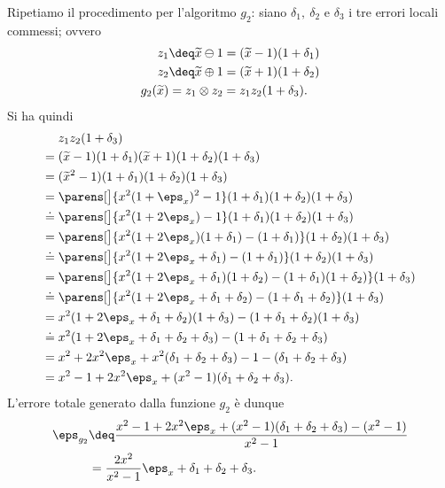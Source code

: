 \begin{example}
Ripetiamo il procedimento per l'algoritmo $g_2$: siano $\delta_1,\ \delta_2$ e $\delta_3$ i tre errori locali commessi; ovvero \begin{align*}
    z_1 &\deq \tilde{x} \ominus 1 = (\tilde x - 1)(1 + \delta_1)\\
    z_2 &\deq \tilde{x} \oplus 1 = (\tilde x + 1)(1 + \delta_2)\\
    g_2(\tilde x) &= z_1 \otimes z_2 = z_1z_2(1 + \delta_3).
\end{align*}
Si ha quindi \begin{align*}
    &z_1z_2(1+\delta_3)\\
    = {}&(\tilde x - 1)(1 + \delta_1)(\tilde x + 1)(1 + \delta_2)(1 + \delta_3)\\
    = {}&(\tilde{x}^2 - 1)(1 + \delta_1)(1 + \delta_2)(1 + \delta_3)\\
    = {}&\parens[\big]{x^2(1 + \eps_x)^2 - 1}(1 + \delta_1)(1 + \delta_2)(1 + \delta_3)\\
    \doteq {}&\parens[\big]{x^2(1 + 2\eps_x) - 1}(1 + \delta_1)(1 + \delta_2)(1 + \delta_3)\\
    = {}&\parens[\big]{x^2(1 + 2\eps_x)(1 + \delta_1) - (1 + \delta_1)}(1 + \delta_2)(1 + \delta_3)\\
    \doteq {}&\parens[\big]{x^2(1 + 2\eps_x + \delta_1) - (1 + \delta_1)}(1 + \delta_2)(1 + \delta_3)\\
    = {}&\parens[\big]{x^2(1 + 2\eps_x + \delta_1)(1 + \delta_2) - (1 + \delta_1)(1 + \delta_2)}(1 + \delta_3)\\
    \doteq {}&\parens[\big]{x^2(1 + 2\eps_x + \delta_1 + \delta_2) - (1 + \delta_1 + \delta_2)}(1 + \delta_3)\\
    = {}&x^2(1 + 2\eps_x + \delta_1 + \delta_2)(1 + \delta_3) - (1 + \delta_1 + \delta_2)(1 + \delta_3)\\
    \doteq {}&x^2(1 + 2\eps_x + \delta_1 + \delta_2 + \delta_3) - (1 + \delta_1 + \delta_2 + \delta_3)\\
    = {}&x^2 + 2x^2\eps_x + x^2(\delta_1 + \delta_2 + \delta_3) - 1 - (\delta_1 + \delta_2 + \delta_3)\\
    = {}&x^2 - 1 + 2x^2\eps_x + (x^2 - 1)(\delta_1 + \delta_2 + \delta_3).
\end{align*}
L'errore totale generato dalla funzione $g_2$ è dunque \begin{align*}
    \eps_{g_2} &\deq \frac{x^2 - 1 + 2x^2\eps_x + (x^2 - 1)(\delta_1 + \delta_2 + \delta_3)- (x^2-1)}{x^2 - 1}\\
    &= \frac{2x^2}{x^2 - 1}\eps_x + \delta_1 + \delta_2 + \delta_3.
\end{align*}


\end{example}
